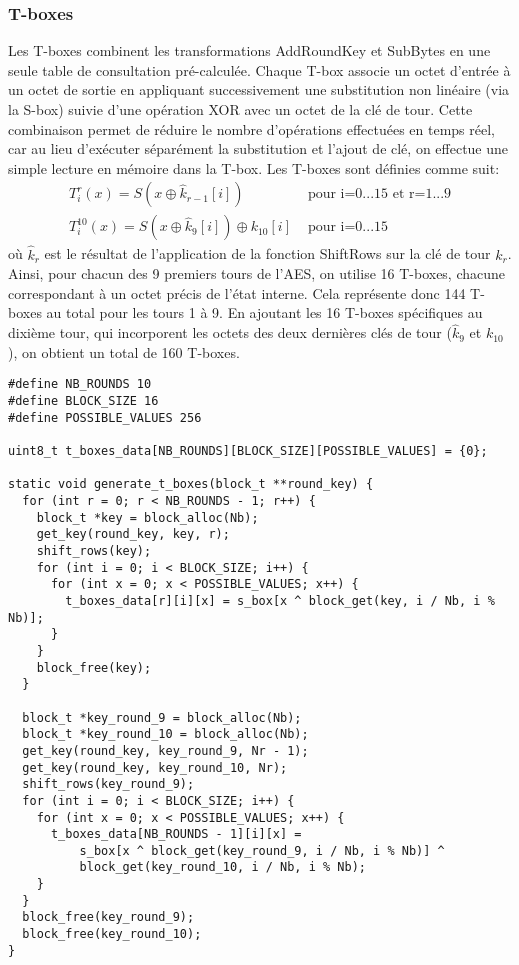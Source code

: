 \documentclass[a4paper, 10pt]{article}
\begin{document}
  \subsubsection{T-boxes}
  \label{sec:t-boxes}
  Les T-boxes combinent les transformations AddRoundKey et SubBytes en une seule table de consultation
   pré-calculée. Chaque T-box associe un octet d’entrée à un octet de sortie en appliquant successivement
    une substitution non linéaire (via la S-box) suivie d’une opération XOR avec un octet de la clé de tour.
   Cette combinaison permet de réduire le nombre d’opérations effectuées en temps réel, car au lieu d’exécuter 
   séparément la substitution et l’ajout de clé, on effectue une simple lecture en mémoire dans la T-box. 
   Les T-boxes sont définies comme suit:
  \begin{align*}
    T_{i}^r(x) = S(x \oplus \hat{k}_{r-1}[i]) & \text{  pour i=0...15 et r=1...9} \\
    T_{i}^{10}(x) = S(x \oplus \hat{k}_{9}[i]) \oplus k_{10}[i] & \text{  pour i=0...15}
  \end{align*}
  où \( \hat{k}_{r}\) est le résultat de l'application de la fonction ShiftRows
  sur la clé de tour \(k_{r}\).
  Ainsi, pour chacun des 9 premiers tours de l’AES, on utilise 16 T-boxes, chacune correspondant 
  à un octet précis de l’état interne. Cela représente donc 144 T-boxes au total pour les tours 
  1 à 9. En ajoutant les 16 T-boxes spécifiques au dixième tour, qui incorporent les octets des
  deux dernières clés de tour (\(\hat{k}_{9}\) et \(k_{10}\)), on obtient un total de 160 T-boxes.

  \scriptsize{
    \begin{verbatim}
#define NB_ROUNDS 10
#define BLOCK_SIZE 16
#define POSSIBLE_VALUES 256

uint8_t t_boxes_data[NB_ROUNDS][BLOCK_SIZE][POSSIBLE_VALUES] = {0};

static void generate_t_boxes(block_t **round_key) {
  for (int r = 0; r < NB_ROUNDS - 1; r++) {
    block_t *key = block_alloc(Nb);
    get_key(round_key, key, r);
    shift_rows(key);
    for (int i = 0; i < BLOCK_SIZE; i++) {
      for (int x = 0; x < POSSIBLE_VALUES; x++) {
        t_boxes_data[r][i][x] = s_box[x ^ block_get(key, i / Nb, i % Nb)];
      }
    }
    block_free(key);
  }

  block_t *key_round_9 = block_alloc(Nb);
  block_t *key_round_10 = block_alloc(Nb);
  get_key(round_key, key_round_9, Nr - 1);
  get_key(round_key, key_round_10, Nr);
  shift_rows(key_round_9);
  for (int i = 0; i < BLOCK_SIZE; i++) {
    for (int x = 0; x < POSSIBLE_VALUES; x++) {
      t_boxes_data[NB_ROUNDS - 1][i][x] =
          s_box[x ^ block_get(key_round_9, i / Nb, i % Nb)] ^
          block_get(key_round_10, i / Nb, i % Nb);
    }
  }
  block_free(key_round_9);
  block_free(key_round_10);
}
    \end{verbatim}
  }
\end{document}
